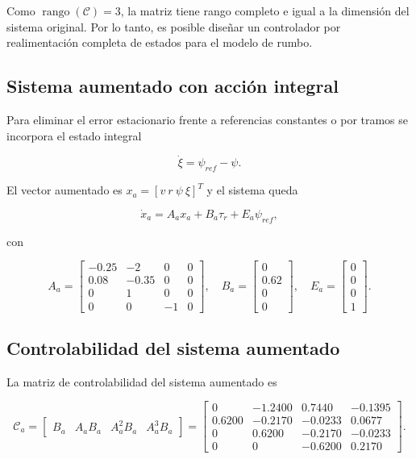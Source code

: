 Como $\operatorname{rango}(\mathcal{C})=3$, la matriz tiene rango completo e igual a la dimensión del sistema original. Por lo tanto, es posible diseñar un controlador por realimentación completa de estados para el modelo de rumbo.

\subsection{Sistema aumentado con acción integral}

Para eliminar el error estacionario frente a referencias constantes o por tramos se incorpora el estado integral

\begin{equation}
\dot{\xi} = \psi_{ref} - \psi.
\end{equation}

El vector aumentado es $x_a = [v\ r\ \psi\ \xi]^T$ y el sistema queda

\begin{equation}
\dot{x}_a = A_a x_a + B_a \tau_r + E_a \psi_{ref},
\end{equation}

con

\begin{equation}
A_a =
\begin{bmatrix}
-0.25 & -2 & 0 & 0 \\
0.08 & -0.35 & 0 & 0 \\
0 & 1 & 0 & 0 \\
0 & 0 & -1 & 0
\end{bmatrix},
\quad
B_a =
\begin{bmatrix}
0 \\
0.62 \\
0 \\
0
\end{bmatrix},
\quad
E_a =
\begin{bmatrix}
0 \\
0 \\
0 \\
1
\end{bmatrix}.
\end{equation}

\subsection{Controlabilidad del sistema aumentado}

La matriz de controlabilidad del sistema aumentado es

\begin{equation}
\mathcal{C}_a =
\begin{bmatrix}
B_a & A_aB_a & A_a^2B_a & A_a^3B_a
\end{bmatrix}
=
\begin{bmatrix}
0 & -1.2400 & 0.7440 & -0.1395 \\
0.6200 & -0.2170 & -0.0233 & 0.0677 \\
0 & 0.6200 & -0.2170 & -0.0233 \\
0 & 0 & -0.6200 & 0.2170
\end{bmatrix}.
\label{eq:controlabilidad-aumentado}
\end{equation}

